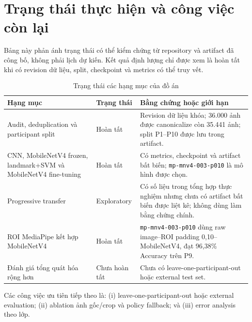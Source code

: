 \chapter{Trạng thái thực hiện và công việc còn lại}

Bảng này phản ánh trạng thái có thể kiểm chứng từ repository và artifact đã công bố, không phải lịch dự kiến. Kết quả định lượng chỉ được xem là hoàn tất khi có revision dữ liệu, split, checkpoint và metrics có thể truy vết.

\begin{table}[ht]
\centering
\small
\caption{Trạng thái các hạng mục của đồ án}
\label{tab:project-status}
\begin{tabular}{p{4.6cm}p{2.6cm}p{6.0cm}}
\toprule
Hạng mục & Trạng thái & Bằng chứng hoặc giới hạn\\
\midrule
Audit, deduplication và participant split & Hoàn tất & Revision dữ liệu khóa; 36.000 ảnh được canonicalize còn 35.441 ảnh; split P1--P10 được lưu trong artifact.\\
CNN, MobileNetV4 frozen, landmark+SVM và MobileNetV4 fine-tuning & Hoàn tất & Có metrics, checkpoint và artifact bất biến; \texttt{mp-mnv4-003-p010} là mô hình được chọn.\\
Progressive transfer & Exploratory & Có số liệu trong tổng hợp thực nghiệm nhưng chưa có artifact bất biến được liệt kê; không dùng làm bằng chứng chính.\\
ROI MediaPipe kết hợp MobileNetV4 & Hoàn tất & \texttt{mp-mnv4-003-p010} dùng raw image--ROI padding 0,10--MobileNetV4, đạt 96,38\% Accuracy trên P9.\\
Đánh giá tổng quát hóa rộng hơn & Chưa hoàn tất & Chưa có leave-one-participant-out hoặc external test set.\\
\bottomrule
\end{tabular}
\end{table}

Các công việc ưu tiên tiếp theo là: (i) leave-one-participant-out hoặc external evaluation; (ii) ablation ảnh gốc/crop và policy fallback; và (iii) error analysis theo lớp.
